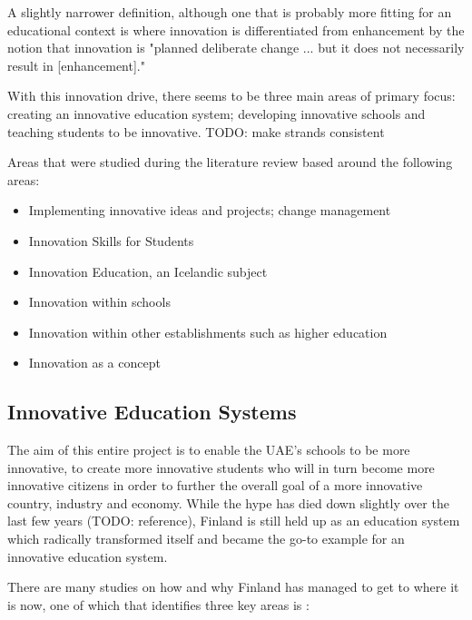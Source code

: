 A slightly narrower definition, although one that is probably more fitting for an educational context is where innovation is differentiated from enhancement by the notion that innovation is "planned deliberate change ... but it does not necessarily result in [enhancement]." \cite{hannan2002innovative}

With this innovation drive, there seems to be three main areas of primary focus: creating an innovative education system; developing innovative schools and teaching students to be innovative. TODO: make strands consistent

Areas that were studied during the literature review based around the following areas:
\begin{itemize}
\item Implementing innovative ideas and projects; change management
\item Innovation Skills for Students
\item Innovation Education, an Icelandic subject
\item Innovation within schools
\item Innovation within other establishments such as higher education
\item Innovation as a concept
\end{itemize}

\subsection{Innovative Education Systems}
The aim of this entire project is to enable the UAE's schools to be more innovative, to create more innovative students who will in turn become more innovative citizens in order to further the overall goal of a more innovative country, industry and economy. While the hype has died down slightly over the last few years (TODO: reference), Finland is still held up as an education system which radically transformed itself and became the go-to example for an innovative education system.

There are many studies on how and why Finland has managed to get to where it is now, one of which that identifies three key areas is \citet{Sahlberg2007}:

